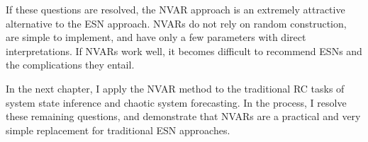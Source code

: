 If these questions are resolved, the NVAR approach is an extremely
attractive alternative to the ESN approach. NVARs do not rely on
random construction, are simple to implement, and have only a few
parameters with direct interpretations. If NVARs work well, it becomes
difficult to recommend ESNs and the complications they entail.

In the next chapter, I apply the NVAR method to the traditional
RC tasks of system state inference and chaotic system forecasting. In
the process, I resolve these remaining questions, and demonstrate
that NVARs are a practical and very simple replacement for traditional
ESN approaches.
